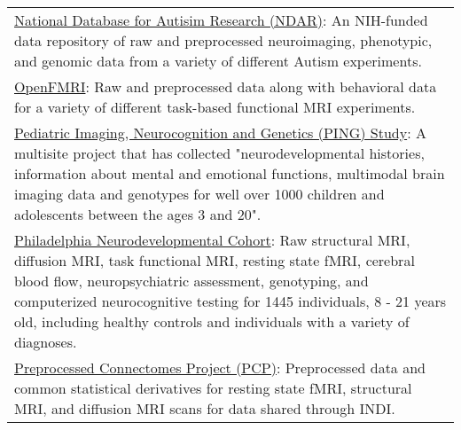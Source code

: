 \begin{table}[h!]
\begin{tabular}{L{5.5in}}
        \href{http://ndar.nih.gov/}{National Database for Autisim Research (NDAR)}: An NIH-funded data repository of raw and preprocessed neuroimaging, phenotypic, and genomic data from a variety of different Autism experiments.\\	
        \href{https://openfmri.org/}{OpenFMRI}: Raw and preprocessed data along with behavioral data for a variety of different task-based functional MRI experiments. \\
        \href{http://pingstudy.ucsd.edu/}{Pediatric Imaging, Neurocognition and Genetics (PING) Study}: A multisite project that has collected "neurodevelopmental histories, information about mental and emotional functions, multimodal brain imaging data and genotypes for well over 1000 children and adolescents between the ages 3 and 20". \\
        \href{http://www.med.upenn.edu/bbl/projects/pnc/PhiladelphiaNeurodevelopmentalCohort.shtml}{Philadelphia Neurodevelopmental Cohort}: Raw structural MRI, diffusion MRI, task functional MRI, resting state fMRI, cerebral blood flow, neuropsychiatric assessment, genotyping, and computerized neurocognitive testing for 1445 individuals, 8 - 21 years old, including healthy controls and individuals with a variety of diagnoses.\\
        \href{http://preprocessed-connectomes-project.github.io/}{Preprocessed Connectomes Project (PCP)}: Preprocessed data and common statistical derivatives for resting state fMRI, structural MRI, and diffusion MRI scans for data shared through INDI. \\
        \hline
      \end{tabular}
\end{table}